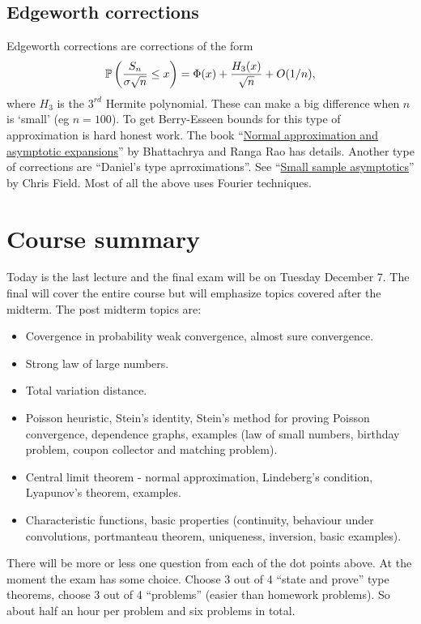 \subsection{Edgeworth corrections}
Edgeworth corrections are corrections of the form 
\[{\mathbb{P}}\left(\frac{S_n}{\sigma\sqrt{n}}\le x\right) = \Phi(x)+\frac{H_3(x)}{\sqrt{n}}+O(1/n), \]
where $H_3$ is the $3^{rd}$ Hermite polynomial. These can make a big difference when $n$ is `small' (eg $n=100$). To get Berry-Esseen bounds for this type of approximation is hard honest work. The book ``\href{https://www.cambridge.org/us/academic/subjects/statistics-probability/probability-theory-and-stochastic-processes/normal-approximation-and-asymptotic-expansions?format=PB&isbn=9780898718973}{Normal approximation and asymptotic expansions}'' by Bhattachrya and Ranga Rao has details. Another type of corrections are ``Daniel's type aprroximations''. See ``\href{https://projecteuclid.org/ebooks/institute-of-mathematical-statistics-lecture-notes-monograph-series/Small-sample-asymptotics/toc/10.1214/lnms/1215468235}{Small sample asymptotics}'' by Chris Field. Most of all the above uses Fourier techniques.
\section{Course summary}
Today is the last lecture and the final exam will be on Tuesday December 7. The final will cover the entire course but will emphasize topics covered after the midterm. The post midterm topics are:
\begin{itemize}
    \item Covergence in probability weak convergence, almost sure convergence.
    \item Strong law of large numbers.
    \item Total variation distance.
    \item Poisson heuristic, Stein's identity, Stein's method for proving Poisson convergence, dependence graphs, examples (law of small numbers, birthday problem, coupon collector and matching problem).
    \item Central limit theorem - normal approximation, Lindeberg's condition, Lyapunov's theorem, examples.
    \item Characteristic functions, basic properties (continuity, behaviour under convolutions, portmanteau theorem, uniqueness, inversion, basic examples).
\end{itemize}
There will be more or less one question from each of the dot points above. At the moment the exam has some choice. Choose 3 out of 4 ``state and prove'' type theorems, choose 3 out of 4 ``problems'' (easier than homework problems). So about half an hour per problem and six problems in total.

